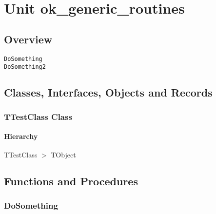 \documentclass{report}
\newif\ifpdf
\begin{document}
\label{toc}\tableofcontents
\newpage
\newlength{\tmplength}
\chapter{Unit ok{\_}generic{\_}routines}
\label{ok_generic_routines}
\section{Overview}
\begin{description}
\item[\texttt{\begin{ttfamily}TTestClass\end{ttfamily} Class}]
\end{description}
\begin{description}
\item[\texttt{DoSomething}]
\item[\texttt{DoSomething2}]
\end{description}
\section{Classes, Interfaces, Objects and Records}
\ifpdf
\subsection*{\large{\textbf{TTestClass Class}}\normalsize\hspace{1ex}\hrulefill}
\else
\subsection*{TTestClass Class}
\fi
\label{ok_generic_routines.TTestClass}
\subsubsection*{\large{\textbf{Hierarchy}}\normalsize\hspace{1ex}\hfill}
TTestClass {$>$} TObject
\section{Functions and Procedures}
\ifpdf
\subsection*{\large{\textbf{DoSomething}}\normalsize\hspace{1ex}\hrulefill}
\else
\end{document}
